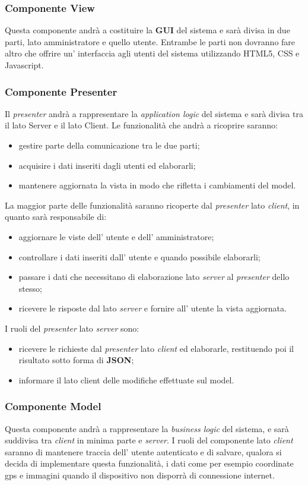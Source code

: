 \subsubsection{Componente View}
Questa componente andrà a costituire la \textbf{GUI} del sistema e sarà divisa in due parti, lato amministratore e quello utente. Entrambe le parti non dovranno fare altro che offrire un' interfaccia agli utenti del sistema utilizzando HTML5, CSS e Javascript.
\subsubsection{Componente Presenter}
Il \textit{presenter} andrà a rappresentare la \textit{application logic} del sistema e sarà divisa tra il lato Server e il lato Client. Le funzionalità che andrà a ricoprire saranno:
\begin{itemize}
	\item gestire parte della comunicazione tra le due parti;
	\item acquisire i dati inseriti dagli utenti ed elaborarli;
	\item mantenere aggiornata la vista in modo che rifletta i cambiamenti del model.
\end{itemize}
La maggior parte delle funzionalità saranno ricoperte dal \textit{presenter} lato \textit{client}, in quanto sarà responsabile di:
\begin{itemize}
	\item aggiornare le viste dell' utente e dell' amministratore;
	\item controllare i dati inseriti dall' utente e quando possibile elaborarli;
	\item passare i dati che necessitano di elaborazione lato \textit{server} al \textit{presenter} dello stesso;
	\item ricevere le risposte dal lato \textit{server} e fornire all' utente la vista aggiornata.
\end{itemize}
I ruoli del \textit{presenter} lato \textit{server} sono:
\begin{itemize}
 \item ricevere le richieste dal \textit{presenter} lato \textit{client} ed elaborarle, restituendo poi il risultato sotto forma di \textbf{JSON};
 \item informare il lato client delle modifiche effettuate sul model.
\end{itemize}
\subsubsection{Componente Model}
Questa componente andrà a rappresentare la \textit{business logic} del sistema, e sarà suddivisa tra \textit{client} in minima parte e \textit{server}.
I ruoli del componente lato \textit{client} saranno di mantenere traccia dell' utente autenticato e di salvare, qualora si decida di implementare questa funzionalità, i dati come per esempio coordinate gps e immagini quando il dispositivo non disporrà di connessione internet.


